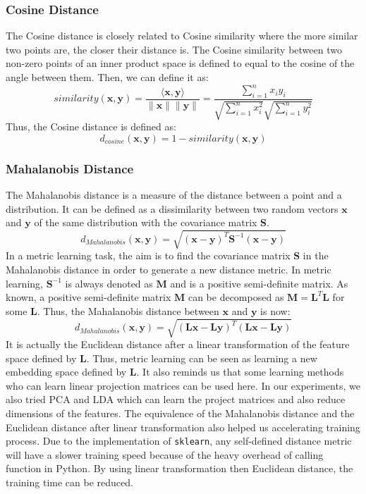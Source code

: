 \documentclass[conference]{IEEEtran}
\begin{document}
\subsubsection{Cosine Distance}
\par
The Cosine distance is closely related to Cosine similarity where the more similar two points are, the closer their distance is. The Cosine similarity between two non-zero points of an inner product space is defined to equal to the cosine of
the angle between them. Then, we can define it as:
\begin{equation}
    similarity(\mathbf{x},\mathbf{y})=\dfrac{\langle\mathbf{x},\mathbf{y}\rangle}{\|\mathbf{x}\| \|\mathbf{y}\|}=\dfrac{\sum_{i=1}^n x_i y_i}{\sqrt{\sum_{i=1}^n x_i^2}\sqrt{\sum_{i=1}^n y_i^2}}
\end{equation}
Thus, the Cosine distance is defined as:
\begin{equation}
    d_{cosine}(\mathbf{x},\mathbf{y})=1-similarity(\mathbf{x},\mathbf{y})
\end{equation}
\subsubsection{Mahalanobis Distance}
\par
The Mahalanobis distance is a measure of the distance between a point and a distribution. It can be defined as a dissimilarity between two random vectors $\mathbf{x}$ and $\mathbf{y}$ of the same distribution with the covariance matrix $\mathbf{S}$.
\begin{equation}
	d_{Mahalanobis}(\mathbf{x}, \mathbf{y})=\sqrt{(\mathbf{x}-\mathbf{y})^T\mathbf{S}^{-1}(\mathbf{x}-\mathbf{y})}
\end{equation}
In a metric learning task, the aim is to find the covariance matrix $\mathbf{S}$ in the Mahalanobis distance in order to generate a new distance metric. In metric learning, $\mathbf{S}^{-1}$ is always denoted as $\mathbf{M}$ and is a positive semi-definite matrix. As known, a positive semi-definite matrix $\mathbf{M}$ can be 
decomposed as $\mathbf{M}=\mathbf{L}^T\mathbf{L}$ for some $\mathbf{L}$. Thus, the Mahalanobis distance between $\mathbf{x}$ and $\mathbf{y}$ is now:
\begin{equation}
	d_{Mahalanobis}(\mathbf{x}, \mathbf{y})=\sqrt{(\mathbf{L}\mathbf{x}-\mathbf{L}\mathbf{y})^T(\mathbf{L}\mathbf{x}-\mathbf{L}\mathbf{y})}
\end{equation}
It is actually the Euclidean distance after a linear transformation of the feature space defined by $\mathbf{L}$. Thus, metric learning can be seen as learning a new embedding space defined by $\mathbf{L}$. It also reminds us that some learning methods who can learn linear projection matrices can be used here.
In our experiments, we also tried PCA and LDA which can learn the project matrices and also reduce dimensions of the features.
The equivalence of the Mahalanobis distance and the Euclidean distance after linear transformation also helped us accelerating training process. Due to the implementation of \texttt{sklearn}, any self-defined distance metric will have a slower training speed because of the heavy overhead of calling function in Python. By using linear transformation then Euclidean distance,
the training time can be reduced.
\end{document}
